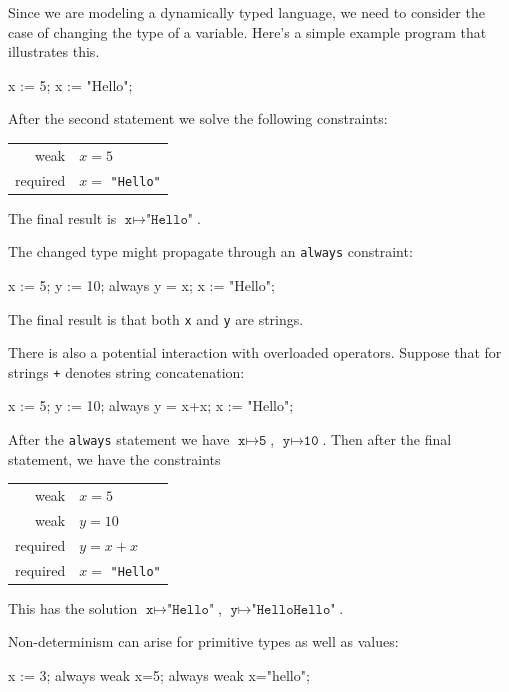 \documentclass{article}
\begin{document}
Since we are modeling a dynamically typed language, we need to
consider the case of changing the type of a variable.  Here's a simple
example program that illustrates this.

\begin{example}
x := 5;
x := "Hello";
\end{example}

After the second statement we solve the following constraints:

\begin{tabular}{rl}
weak     & $x = 5$ \\
required & $x = $ \verb|"Hello"|
\end{tabular}

The final result is $\texttt{x} \mapsto \texttt{"Hello"}$.

The changed type might propagate through an \verb|always| constraint:

\begin{example}
x := 5;
y := 10;
always y = x;
x := "Hello";
\end{example}

The final result is that both \verb|x| and \verb|y| are strings.

There is also a potential interaction with overloaded operators.
Suppose that for strings \verb|+| denotes string concatenation:

\begin{example}
x := 5;
y := 10;
always y = x+x;
x := "Hello";
\end{example}

After the \verb|always| statement we have 
$\texttt{x} \mapsto \texttt{5}$, $\texttt{y} \mapsto \texttt{10}$.
Then after the final statement, we have the constraints

\begin{tabular}{rl}
weak     & $x=5$ \\
weak     & $y=10$ \\
required & $y=x+x$ \\
required & $x=$ \texttt{"Hello"}
\end{tabular}

This has the solution $\texttt{x} \mapsto \texttt{"Hello"}$, 
$\texttt{y} \mapsto \texttt{"HelloHello"}$.

Non-determinism can arise for primitive types as well as values:

\begin{example}
x := 3;
always weak x=5;
always weak x="hello";
\end{example}
\end{document}

